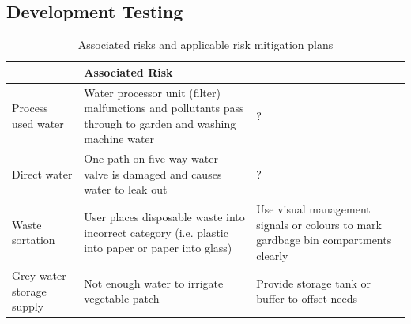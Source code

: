 \documentclass[a4paper,11pt,fleqn]{report}
\begin{document}
\subsection{Development Testing}
%
\begin{table}[h!]
\caption {Associated risks and applicable risk mitigation plans} \label{tb: Functional_SS_elements} 
\begin{center}
\begin{tabular}{p{3cm}|p{5cm}|p{5cm}}\toprule
	{\textbf{Function} & \textbf{Associated Risk}} & {\textbf{Risk Mitigation}\\ \midrule
    \hline
    Process used water & Water processor unit (filter) malfunctions and pollutants pass through to garden and washing machine water & ?\\
     \hline
    Direct water & One path on five-way water valve is damaged and causes water to leak out & ?\\
     \hline
    Waste sortation & User places disposable waste into incorrect category (i.e. plastic into paper or paper into glass) & Use visual management signals or colours to mark gardbage bin compartments clearly
\\
    \hline
Grey water storage supply & Not enough water to irrigate vegetable patch & Provide storage tank or buffer to offset needs\\
    \bottomrule
\end{tabular}
\end{center}
\end{table}
%
%
\end{document}

